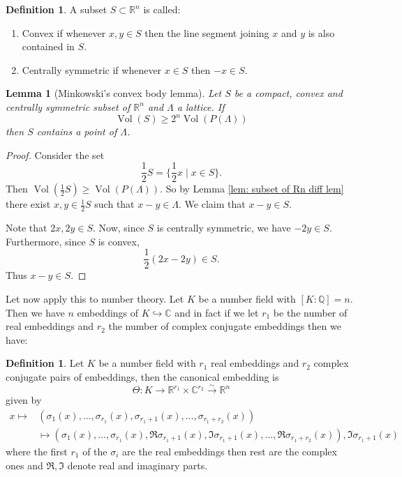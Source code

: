 \documentclass[11pt,a4paper]{report}
\theoremstyle{plain}
\newtheorem{lem}[subsection]{Lemma}
\theoremstyle{definition}
\newtheorem{defn}[subsection]{Definition}
\theoremstyle{definition}
\newcommand{\RR}{\mathbb{R}}
\def\CC{\mathbb{C}}
\def\QQ{\mathbb{Q}}
\def \s {\sigma}
\def \s {\sigma}
\DeclareMathOperator{\Vol}{Vol}
\def \lra{\longrightarrow}
\begin{document}
\begin{defn}
	A subset $S \subset \RR^n$ is called:
	\begin{enumerate}
		\item Convex if whenever $x,y \in S$ then the line segment joining $x$ and $y$ is also contained in $S$.
		\item Centrally symmetric if whenever $x \in S$ then $-x \in S$.
	\end{enumerate}
\end{defn}

\begin{lem}[Minkowski's convex body lemma]\label{lem: mink conv bod}
	Let $S$ be a compact, convex and centrally symmetric subset of $\RR^n$ and $\Lambda$ a lattice. If \[\Vol(S) \geq 2^n \Vol(P(\Lambda))\] then $S$ contains a point of $\Lambda$. 
\end{lem}

\begin{proof}
	Consider the set \[\frac{1}{2}S=\{\frac{1}{2} x \mid x \in S\}.\] Then $\Vol(\frac{1}{2}S) \geq \Vol(P(\Lambda))$. So by Lemma \ref{lem: subset of Rn diff lem} there exist $x,y \in \frac{1}{2}S$ such that $x-y \in \Lambda$. We claim that $x-y \in S$. 
	
	Note that $2x,2y \in S$. Now, since $S$ is centrally symmetric, we have $-2y \in S$. Furthermore, since $S$ is convex, \[\frac{1}{2} (2x-2y) \in S.\] Thus $x-y \in S$.
\end{proof}

Let now apply this to number theory. Let $K$ be a number field with $[K:\QQ]=n$. Then we have $n$ embeddings of $K \hookrightarrow \CC$ and in fact if we let $r_1$ be the number of real embeddings and $r_2$ the number of complex conjugate embeddings then we have:

\begin{defn}
	Let $K$ be a number field with $r_1$ real embeddings and $r_2$ complex conjugate pairs of embeddings, then the canonical embedding is \[\Theta: K \lra \RR^{r_1} \times \CC^{r_2} \overset{\sim}{\lra} \RR^n\] given by \begin{align*}
		x \mapsto& (\s_1(x),\dots,\s_{r_1}(x),\s_{r_1+1}(x),\dots,\s_{r_1+r_2}(x))\\ &\mapsto (\s_1(x),\dots,\s_{r_1}(x),\Re \s_{r_1+1}(x),\Im\s_{r_1+1}(x), \dots,\Re \s_{r_1+r_2}(x)), \Im \s_{r_1+1}(x) 
	\end{align*} where the first $r_1$ of the $\s_i$ are the real embeddings then rest are the complex ones and $\Re,\Im$ denote real and imaginary parts.
\end{defn}
\end{document}
